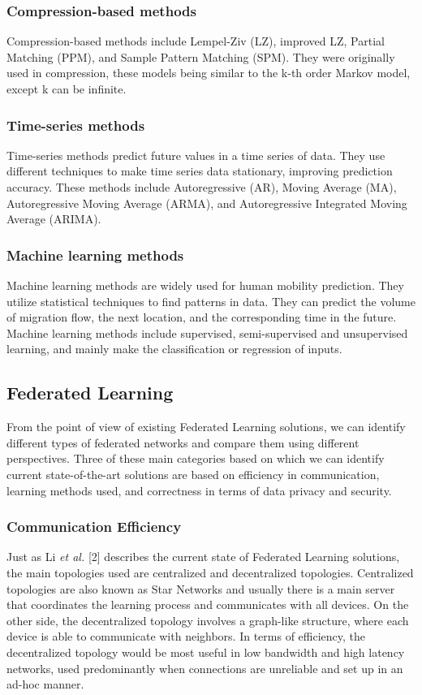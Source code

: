 \documentclass[conference]{IEEEtran}
\begin{document}
\subsubsection{Compression-based methods}
Compression-based methods include Lempel-Ziv (LZ), improved LZ, Partial Matching (PPM), and Sample Pattern Matching (SPM). They were originally used in compression, these models being similar to the k-th order Markov model, except k can be infinite.

\subsubsection{Time-series methods}
Time-series methods predict future values in a time series of data. They use different techniques to make time series data stationary, improving prediction accuracy. These methods include Autoregressive (AR), Moving Average (MA), Autoregressive Moving Average (ARMA), and Autoregressive Integrated Moving Average (ARIMA).

\subsubsection{Machine learning methods}
Machine learning methods are widely used for human mobility prediction. They utilize statistical techniques to find patterns in data. They can predict the volume of migration flow, the next location, and the corresponding time in the future. Machine learning methods include supervised, semi-supervised and unsupervised learning, and mainly make the classification or regression of inputs.
\subsection{Federated Learning}

From the point of view of existing Federated Learning solutions, we can identify different types of federated networks and compare them using different perspectives. Three of these main categories based on which we can identify current state-of-the-art solutions are based on efficiency in communication, learning methods used, and correctness in terms of data privacy and security.

\subsubsection{Communication Efficiency}

Just as Li \textit{et al.} [2] describes the current state of Federated Learning solutions, the main topologies used are centralized and decentralized topologies. Centralized topologies are also known as Star Networks and usually there is a main server that coordinates the learning process and communicates with all devices. On the other side, the decentralized topology involves a graph-like structure, where each device is able to communicate with neighbors. In terms of efficiency, the decentralized topology would be most useful in low bandwidth and high latency networks, used predominantly when connections are unreliable and set up in an ad-hoc manner.
\end{document}
